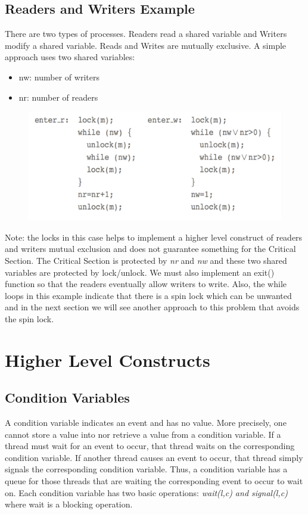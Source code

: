 \documentclass{hw}
\begin{document}
\subsection{Readers and Writers Example}
There are two types of processes. Readers read a shared variable and Writers 
modify a shared variable. Reads and Writes are mutually exclusive. A simple 
approach uses two shared variables:
\begin{itemize}
  \item nw: number of writers
  \item nr: number of readers
\end{itemize}

\begin{figure}[H]
  \centering
  \includegraphics[scale=.6]{img/readwrite}
\end{figure}

Note: the locks in this case helps to implement a higher level construct of readers
and writers mutual exclusion and does not guarantee something for the Critical 
Section. The Critical Section is protected by \emph{nr} and \emph{nw} and these
two shared variables are protected by lock/unlock. We must also implement an exit()
function so that the readers eventually allow writers to write. Also, the while
loops in this example indicate that there is a spin lock which can be unwanted
and in the next section we will see another approach to this problem that avoids
the spin lock.


\section{Higher Level Constructs}
\subsection{Condition Variables}
A condition variable indicates an event and has no value. More precisely, one 
cannot store a value into nor retrieve a value from a condition variable. If a 
thread must wait for an event to occur, that thread waits on the corresponding 
condition variable. If another thread causes an event to occur, that thread 
simply signals the corresponding condition variable. Thus, a condition variable 
has a queue for those threads that are waiting the corresponding event to occur 
to wait on. Each condition variable has two basic operations: \emph{wait(l,c) and
signal(l,c)} where wait is a blocking operation.
\end{document}
